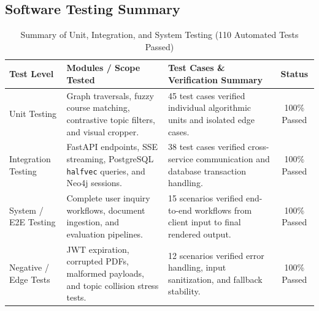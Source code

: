 \documentclass[11pt, a4paper]{article}
\begin{document}
\subsection{Software Testing Summary}
\begin{table}[H]
    \centering
    \footnotesize
    \renewcommand{\arraystretch}{1.25}
    \begin{tabular}{|p{2.8cm}|p{4.2cm}|p{4.6cm}|c|}
        \hline
        \textbf{Test Level} & \textbf{Modules / Scope Tested} & \textbf{Test Cases \& Verification Summary} & \textbf{Status} \\
        \hline
        Unit Testing & Graph traversals, fuzzy course matching, contrastive topic filters, and visual cropper. & 45 test cases verified individual algorithmic units and isolated edge cases. & 100\% Passed \\
        \hline
        Integration Testing & FastAPI endpoints, SSE streaming, PostgreSQL \texttt{halfvec} queries, and Neo4j sessions. & 38 test cases verified cross-service communication and database transaction handling. & 100\% Passed \\
        \hline
        System / E2E Testing & Complete user inquiry workflows, document ingestion, and evaluation pipelines. & 15 scenarios verified end-to-end workflows from client input to final rendered output. & 100\% Passed \\
        \hline
        Negative / Edge Tests & JWT expiration, corrupted PDFs, malformed payloads, and topic collision stress tests. & 12 scenarios verified error handling, input sanitization, and fallback stability. & 100\% Passed \\
        \hline
    \end{tabular}
    \caption{Summary of Unit, Integration, and System Testing (110 Automated Tests Passed)}
\end{table}
\end{document}
